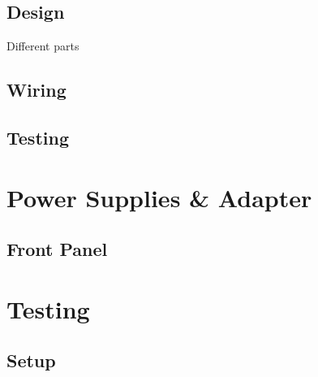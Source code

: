 \documentclass[12pt,a4paper,oneside]{article}
\begin{document}
\subsection{Design}
\label{sec:Design}
Different parts

\subsection{Wiring}
\label{sec:Wiring}


\subsection{Testing}
\label{sec:Testing}

\section{Power Supplies \& Adapter}
\label{sec:Power}



\subsection{Front Panel}      
\label{sec:FrontPannel}

\section{Testing}
\label{sec:Testing}


\subsection{Setup}
\label{sec:Testing_Setup}
\end{document}
